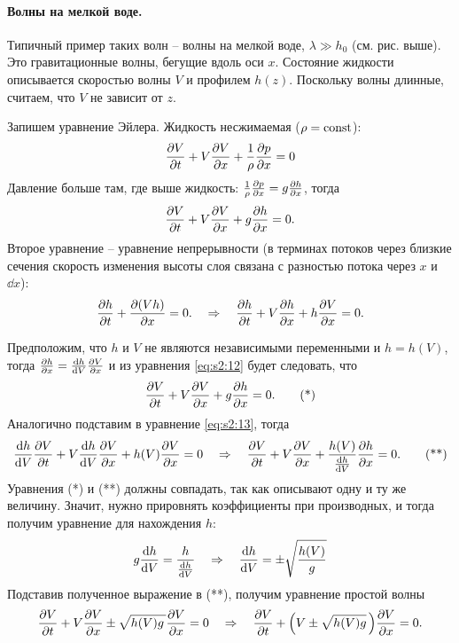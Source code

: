 \paragraph{Волны на мелкой воде. } Типичный пример таких волн -- волны на мелкой воде, $\lambda \gg h_0$ (см. рис. выше). Это гравитационные волны, бегущие вдоль оси $x$. 
Состояние жидкости описывается скоростью волны $V$  и профилем $h(z)$. Поскольку волны длинные, считаем, что $V$ не зависит от $z$.


Запишем уравнение Эйлера. Жидкость несжимаемая ($\rho=\textrm{const}$): 
\begin{gather*}
	\pdv{V}{t}+V\pdv{V}{x}+\frac1{\rho}\pdv{p}{x}=0
\end{gather*}
Давление больше там, где выше жидкость: $\frac1{\rho}\pdv{p}{x}=g\pdv{h}{x}$, тогда
\begin{equation}
	\pdv{V}{t}+V\pdv{V}{x}+g\pdv{h}{x}=0.
	\label{eq:s2:12}
\end{equation}
Второе уравнение -- уравнение непрерывности (в терминах потоков через близкие сечения скорость изменения высоты слоя связана с разностью потока через $x$ и $\dd x$):
\begin{equation}
	\pdv{h}{t}+\pdv{(Vh)}{x}=0. 
	\quad \Rightarrow \quad
	\pdv{h}{t}+V\pdv{h}{x}+h\pdv{V}{x}=0.
	\label{eq:s2:13}
\end{equation}

Предположим, что $h$ и $V$ не являются независимыми переменными и $h=h(V)$, тогда $\pdv{h}{x}=\dv{h}{V}\pdv{V}{x}$ и из уравнения \eqref{eq:s2:12} будет следовать, что 
\begin{gather*}
	\pdv{V}{t}+V\pdv{V}{x}+g\pdv{h}{x} = 0.
	 \tag{*}
\end{gather*}
Аналогично подставим в уравнение \eqref{eq:s2:13}, тогда
\begin{gather*}
	\dv{h}{V}\pdv{V}{t}+V\dv{h}{V}\pdv{V}{x}+h(V)\pdv{V}{x} = 0
	\quad \Rightarrow \quad
	\pdv{V}{t}+V\pdv{V}{x}+\frac{h(V)}{\dv{h}{V}}\pdv{h}{x} = 0.
	\tag{**}
\end{gather*}
Уравнения (*) и (**) должны совпадать, так как описывают одну и ту же величину. Значит, нужно прировнять коэффициенты при производных, и тогда получим уравнение для нахождения $h$:
\begin{equation*}
	g\dv{h}{V}=\frac{h}{\dv{h}{V}}
	\quad \Rightarrow \quad
	\dv{h}{V}=\pm \sqrt{\frac{h(V)}{g}}
\end{equation*}
Подставив полученное выражение в (**), получим уравнение простой волны
\begin{equation}
	\pdv{V}{t}+V\pdv{V}{x}\pm \sqrt{h(V)g\,} \pdv{V}{x} = 0
	\quad \Rightarrow \quad
	\pdv{V}{t}+\qty(V\pm \sqrt{h(V)g}\,)\pdv{V}{x} = 0.
	\label{eq:s2:14}
\end{equation}

